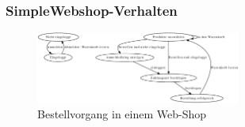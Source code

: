 \subsubsection{SimpleWebshop-Verhalten}

\begin{figure}[htp]
\begin{center}
  \includegraphics[width=0.6\textwidth]{./graphics/webshop.dot.eps}
  \caption[labelInTOC]{Bestellvorgang in einem Web-Shop}
  \label{webshop_behaviour}
\end{center}
\end{figure}